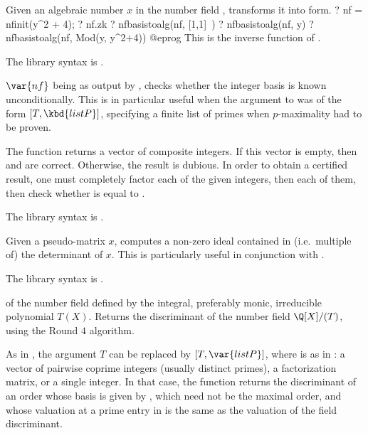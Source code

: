 \label{se:nfbasistoalg}
Given an algebraic number $x$ in the number field , transforms it
into  form.
\bprog
? nf = nfinit(y^2 + 4);
? nf.zk
? nfbasistoalg(nf, [1,1]~)
? nfbasistoalg(nf, y)
? nfbasistoalg(nf, Mod(y, y^2+4))
@eprog
This is the inverse function of .

The library syntax is .

\label{se:nfcertify}
$\var{nf}$ being as output by
, checks whether the integer basis is known unconditionally.
This is in particular useful when the argument to  was of the
form $[T, \kbd{listP}]$, specifying a finite list of primes when
$p$-maximality had to be proven.

The function returns a vector of composite integers. If this vector is
empty, then  and  are correct. Otherwise, the
result is dubious. In order to obtain a certified result, one must
completely factor each of the given integers, then  each of
them, then check whether  is equal to .

The library syntax is .

\label{se:nfdetint}
Given a pseudo-matrix $x$, computes a
non-zero ideal contained in (i.e.~multiple of) the determinant of $x$. This
is particularly useful in conjunction with .

The library syntax is .

\label{se:nfdisc}
 of the number field defined by the integral,
preferably monic, irreducible polynomial $T(X)$. Returns the discriminant of
the number field $\Q[X]/(T)$, using the Round $4$ algorithm.


As in , the argument $T$ can be replaced by $[T,\var{listP}]$,
where  is as in : a vector of
pairwise coprime integers (usually distinct primes), a factorization matrix,
or a single integer. In that case, the function returns the discriminant of
an order whose basis is given by , which need not be
the maximal order, and whose valuation at a prime entry in  is the
same as the valuation of the field discriminant.

